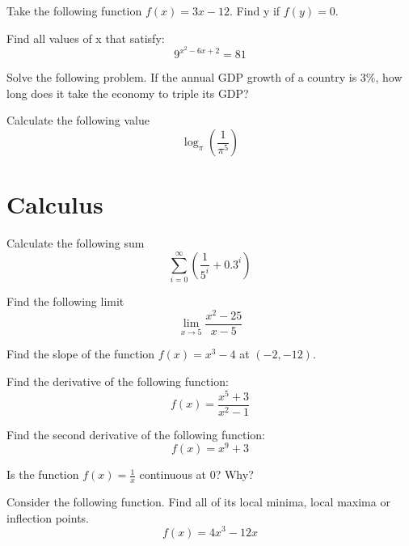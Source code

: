 \documentclass[10pt]{article}
\newenvironment{problem}[2][Problem]{\begin{trivlist}
\item[\hskip \labelsep {\bfseries #1}\hskip \labelsep {\bfseries #2.}]}{\end{trivlist}}
\begin{document}
\begin{problem}{2.2}
Take the following function $f(x)=3x-12$. Find y if $f(y)=0$.
\end{problem}

\begin{problem}{2.3}
Find all values of x that satisfy:
$$9^{x^2-6x+2}=81$$
\end{problem}

\begin{problem}{2.4}
Solve the following problem. If the annual GDP growth of a country is 3\%, how long does it take the economy to triple its GDP?
\end{problem}

\begin{problem}{2.5}
Calculate the following value
$$\log_{\pi}\left(\frac{1}{\pi^5} \right)$$
\end{problem}

\section{Calculus}

\begin{problem}{3.1}
Calculate the following sum
$$\sum\limits_{i=0}^{\infty} \left( \frac{1}{5^i}+0.3^i\right)$$
\end{problem}

\begin{problem}{3.2}
Find the following limit
$$\lim\limits_{x \rightarrow 5}\frac{x^2-25}{x-5}$$
\end{problem}

\begin{problem}{3.3}
Find the slope of the function $f(x)=x^3-4$ at $(-2,-12)$.
\end{problem}

\begin{problem}{3.4}
Find the derivative of the following function:
$$f(x)= \frac{x^5+3}{x^2-1}$$
\end{problem}

\begin{problem}{3.5}
Find the second derivative of the following function:
 $$f(x) = x^9+3$$
\end{problem}

\begin{problem}{3.6}
Is the function  $f(x)=\frac{1}{x}$ continuous at $0$? Why?
\end{problem}

\begin{problem}{3.7}
Consider the following function. Find all of its local minima, local maxima or inflection points. 
$$f(x)=4x^3-12x$$
\end{problem}
\end{document}
